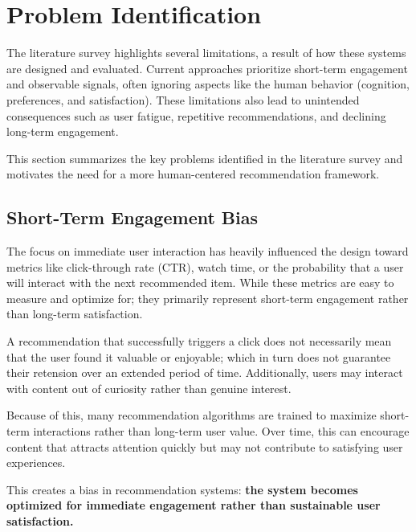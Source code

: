 \section{Problem Identification}

The literature survey highlights several limitations, a result of how these systems are designed and evaluated.
Current approaches prioritize short-term engagement and observable signals, often ignoring aspects 
like the human behavior (cognition, preferences, and satisfaction).
These limitations also lead to unintended consequences such as user fatigue, repetitive recommendations, 
and declining long-term engagement.

This section summarizes the key problems identified in the literature survey 
and motivates the need for a more human-centered recommendation framework.


\subsection{Short-Term Engagement Bias}

The focus on immediate user interaction has heavily influenced the design toward 
metrics like click-through rate (CTR), watch time, or the probability that a user
will interact with the next recommended item.
While these metrics are easy to measure and optimize for; they primarily represent 
short-term engagement rather than long-term satisfaction.

A recommendation that successfully triggers a click does not necessarily mean that
the user found it valuable or enjoyable; which in turn does not guarantee their 
retension over an extended period of time.
Additionally, users may interact with content out of curiosity rather than genuine interest.

Because of this, many recommendation algorithms are trained to 
maximize short-term interactions rather than long-term user value.
Over time, this can encourage content that attracts attention 
quickly but may not contribute to satisfying user experiences.

This creates a bias in recommendation systems: \textbf{the system becomes optimized for immediate engagement rather than sustainable user satisfaction.}


